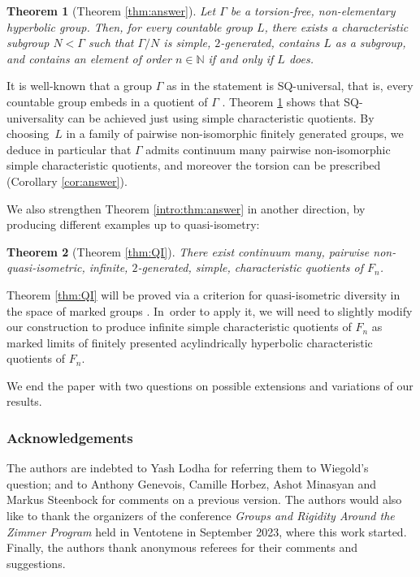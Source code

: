 \documentclass[11pt]{article}
\newtheorem{theorem}{Theorem}[section]
\theoremstyle{definition}
\begin{document}
\begin{theorem}[Theorem \ref{thm:answer}]
\label{intro:thm:answer:strong}
Let $\Gamma$ be a torsion-free, non-elementary hyperbolic group. Then, for every countable group $L$, there exists a characteristic subgroup $N < \Gamma$ such that $\Gamma / N$ is simple, $2$-generated, contains $L$ as a subgroup, and contains an element of order $n \in \mathbb{N}$ if and only if $L$ does.
\end{theorem}

It is well-known that a group $\Gamma$ as in the statement is SQ-universal, that is, every countable group embeds in a quotient of $\Gamma$ \cite{SQ1, SQ2}. Theorem \ref{intro:thm:answer:strong} shows that SQ-universality can be achieved just using simple characteristic quotients. By choosing~$L$ in a family of pairwise non-isomorphic finitely generated groups, we deduce in particular that $\Gamma$ admits continuum many pairwise non-isomorphic simple characteristic quotients, and moreover the torsion can be prescribed (Corollary \ref{cor:answer}).

We also strengthen Theorem \ref{intro:thm:answer} in another direction, by producing different examples up to quasi-isometry:

\begin{theorem}[Theorem \ref{thm:QI}]
\label{intro:thm:QI}
There exist continuum many, pairwise non-quasi-isometric, infinite, $2$-generated, simple, characteristic quotients of $F_n$.
\end{theorem}

Theorem \ref{thm:QI} will be proved via a criterion for quasi-isometric diversity in the space of marked groups \cite{diversity}. In~order to apply it, we will need to slightly modify our construction to produce infinite simple characteristic quotients of $F_n$ as marked limits of finitely presented acylindrically hyperbolic characteristic quotients of $F_n$.

We end the paper with two questions on possible extensions and variations of our results.

\subsubsection*{Acknowledgements}
The authors are indebted to Yash Lodha for referring them to Wiegold's question; and to Anthony Genevois, Camille Horbez, Ashot Minasyan and Markus Steenbock for comments on a previous version.
The authors would also like to thank the organizers of the conference \emph{Groups and Rigidity Around the Zimmer Program} held in Ventotene in September 2023, where this work started.
Finally, the authors thank anonymous referees for their comments and suggestions.
\end{document}
